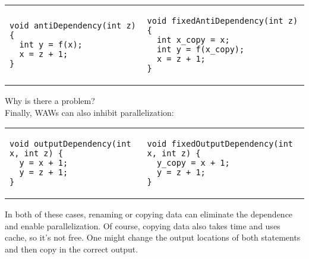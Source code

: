 \documentclass[11pt]{article}
\begin{document}
{\small \begin{center}
\begin{tabular}{ll}
\begin{minipage}{.4\textwidth}
\begin{verbatim}
void antiDependency(int z) {
  int y = f(x);
  x = z + 1;
}
\end{verbatim}
\end{minipage} &
\begin{minipage}{.4\textwidth}
\begin{verbatim}
void fixedAntiDependency(int z) {
  int x_copy = x;
  int y = f(x_copy);
  x = z + 1;
}
\end{verbatim}
\end{minipage} 
\end{tabular}
\end{center} }
{\sf Why is there a problem?}\\[2em]

Finally, WAWs can also inhibit parallelization:

{\small \begin{center}
\begin{tabular}{ll}
\begin{minipage}{.45\textwidth}
\begin{verbatim}
void outputDependency(int x, int z) {
  y = x + 1;
  y = z + 1;
}
\end{verbatim}
\end{minipage} &
\begin{minipage}{.4\textwidth}
\begin{verbatim}
void fixedOutputDependency(int x, int z) {
  y_copy = x + 1;
  y = z + 1;
}
\end{verbatim}
\end{minipage} 
\end{tabular}
\end{center} }

In both of these cases, renaming or copying data can
eliminate the dependence and enable parallelization. Of course,
copying data also takes time and uses cache, so it's not free. One
might change the output locations of both statements and then copy in
the correct output.
\end{document}
